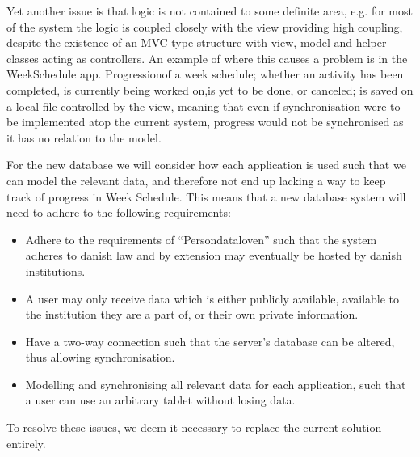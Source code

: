 Yet another issue is that logic is not contained to some definite area, e.g. for most of the system the logic is coupled closely with the view providing high coupling, despite the existence of an MVC type structure with view, model and helper classes acting as controllers.
An example of where this causes a problem is in the WeekSchedule app.
Progressionof a week schedule; whether an activity has been completed, is currently being worked on,is yet to be done, or canceled; is saved on a local file controlled by the view, meaning that even if synchronisation were to be implemented atop the current system, progress would not be synchronised as it has no relation to the model.

For the new database we will consider how each application is used such that we can model the relevant data, and therefore not end up lacking a way to keep track of progress in Week Schedule.
This means that a new database system will need to adhere to the following requirements:
\begin{itemize}
	\item Adhere to the requirements of ``Persondataloven'' such that the system adheres to danish law and by extension may eventually be hosted by danish institutions.
	\item A user may only receive data which is either publicly available, available to the institution they are a part of, or their own private information.
	\item Have a two-way connection such that the server's database can be altered, thus allowing synchronisation.
	\item Modelling and synchronising all relevant data for each application, such that a user can use an arbitrary tablet without losing data.
\end{itemize}
To resolve these issues, we deem it necessary to replace the current solution entirely.